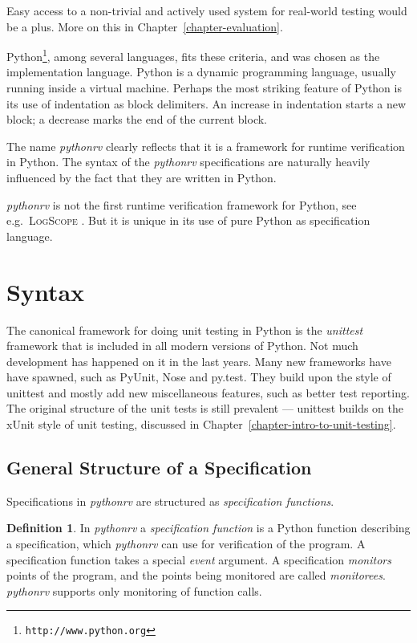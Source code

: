 \documentclass[a4paper,11pt]{kth-mag}
\theoremstyle{definition}
\newtheorem{mydef}{Definition}
\begin{document}
Easy access to a non-trivial and actively used system for real-world testing
would be a plus. More on this in Chapter~\ref{chapter-evaluation}.

Python\footnote{\texttt{http://www.python.org}}, among several languages, fits
these criteria, and was chosen as the implementation language. Python is a
dynamic programming language, usually running inside a virtual machine.
Perhaps the most striking feature of Python is its use of indentation as block
delimiters. An increase in indentation starts a new block; a decrease marks the
end of the current block.

The name \textit{pythonrv} clearly reflects that it is a framework for runtime
verification in Python. The syntax of the \textit{pythonrv} specifications are
naturally heavily influenced by the fact that they are written in Python.

\textit{pythonrv} is not the first runtime verification framework for Python,
see e.g.\ \textsc{LogScope} \cite{barringer09tutorial}. But it is unique in its
use of pure Python as specification language.


\section{Syntax} \label{section-approach-syntax}

The canonical framework for doing unit testing in Python is the
\textit{unittest} framework that is included in all modern versions of Python.
Not much development has happened on it in the last years. Many new frameworks
have have spawned, such as PyUnit, Nose and py.test. They build upon the style
of unittest and mostly add new miscellaneous features, such as better test
reporting. The original structure of the unit tests is still prevalent ---
unittest builds on the xUnit style of unit testing, discussed in
Chapter~\ref{chapter-intro-to-unit-testing}.

\subsection{General Structure of a Specification}

Specifications in \textit{pythonrv} are structured as \textit{specification
functions}.

\begin{mydef}\label{def-specification-function}
In \textit{pythonrv} a \textit{specification function} is a Python function
describing a specification, which \textit{pythonrv} can use for verification of
the program. A specification function takes a special \textit{event} argument.
A specification \textit{monitors} points of the program, and the points being
monitored are called \textit{monitorees}. \textit{pythonrv} supports only
monitoring of function calls.
\end{mydef}
\end{document}
